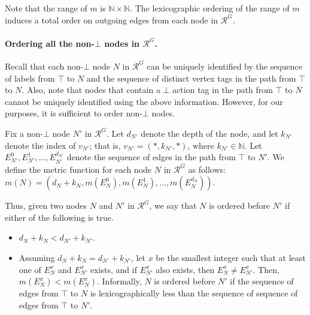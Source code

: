 \documentclass[11pt]{article}
\numberwithin{theorem}{section}
\begin{document}
Note that the range of $m$ is $\mathbb{N} \times \mathbb{N}$. The lexicographic ordering of the range of $m$ induces a total order on outgoing edges from each node in $\mathcal{R}^G$.







\paragraph{Ordering all the non-$\bot$ nodes in $\mathcal{R}^G$.}
Recall that each non-$\bot$ node $N$ in $\mathcal{R}^G$ can be uniquely identified by the sequence of labels from $\top$ to $N$ and the sequence of distinct vertex tags in the path from $\top$ to $N$. Also, note that nodes that contain a $\bot$ action tag in the path from $\top$ to $N$ cannot be uniquely identified using the above information. However, for our purposes, it is sufficient to order non-$\bot$ nodes.

Fix a non-$\bot$ node $N'$ in $\mathcal{R}^G$. Let $d_{N'}$ denote the depth of the node, and let $k_{N'}$ denote the index of $v_{N'}$; that is, $v_{N'}=(*,k_{N'}, *)$, where $k_{N'} \in \mathbb{N}$. Let $E^0_{N'}, E^1_{N'},\ldots,E^{d_{N'}}_{N'}$ denote the sequence of edges in the path from $\top$ to $N'$. We define the metric function for each node $N$ in $\mathcal{R}^G$ as follows: $m(N) = (d_N + k_N, m(E^0_N), m(E^1_N),\ldots,m(E^{d_N}_N))$.

Thus, given two nodes $N$ and $N'$ in $\mathcal{R}^G$, we say that $N$ is ordered before $N'$ if either of the following is true.
\begin{itemize}
\item $d_N + k_N < d_{N'} + k_{N'}$.
\item Assuming $d_N + k_N = d_{N'} + k_{N'}$, let $x$ be the smallest integer such that at least one of $E^x_{N}$ and $E^x_{N'}$ exists, and if $E^{x}_{N'}$ also exists, then  $E^x_{N} \neq E^x_{N'}$. Then, $m(E^x_{N}) < m(E^x_N)$. Informally, $N$ is ordered before $N'$ if the sequence of edges from $\top$ to $N$ is lexicographically less than the sequence of sequence of edges from $\top$ to $N'$. 
\end{itemize}
\end{document}
